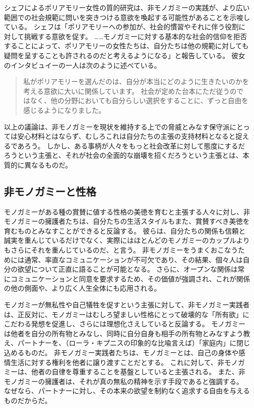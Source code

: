 \documentclass[paper=a4,book,openany]{jlreq}
\begin{document}
シェフによるポリアモリー女性の質的研究は、非モノガミーの実践が、より広い範囲での社会規範に問いを突きつける意欲を喚起する可能性があることを示唆している。
シェフは「ポリアモリーへの参加が、社会的慣習やそれに伴う役割に対して挑戦する意欲を促す。
……モノガミーに対する基本的な社会的信仰を拒否することによって、ポリアモリーの女性たちは、自分たちは他の規範に対しても疑問を呈することも許されるのだと考えるようになる」と報告している。
彼女のインタビュイーの一人は次のように述べている。

\begin{quote}
  私がポリアモリーを選んだのは、自分が本当にどのように生きたいのかを考える意欲に大いに関係しています。
社会が定めた台本にただ従うのではなく、他の分野においても自分らしい選択をすることに、ずっと自由を感じるようになりました。
\citep[pp.9--10]{sheff05:_polyam_women_sexual_subjec_power}

\end{quote}

以上の議論は、非モノガミーを現状を維持する上での脅威とみなす保守派にとっては安心材料とはならず、むしろこれは自分たちの主張の支持材料となると捉えるであろう。
しかし、ある事柄が人々をもっと社会改革に対して態度にするだろうという主張と、それが社会の全面的な崩壊を招くだろうという主張とは、本質的に異なるものだ。

\subsection{非モノガミーと性格}

モノガミーがある種の賞賛に値する性格の美徳を育むと主張する人々に対し、非モノガミーの擁護者たちは、自分たちの生活スタイルもまた、賞賛すべき美徳を育むものとみなすことができると反論する。
彼らは、自分たちの関係も信頼と誠実を重んじているだけでなく、実際にはほとんどのモノガミーのカップルよりもさらにそれを重んじているのだ、と言う。
非モノガミーをうまくおこなうためには通常、率直なコミュニケーションが不可欠であり、その結果、個々人は自分の欲望について正直に語ることが可能となる。
さらに、オープンな関係は常にコミュニケーションと同意を要求するため、その価値が強調され、これが関係の他の側面や、より広く人生全体にも応用される。

モノガミーが無私性や自己犠牲を促すという主張に対して、非モノガミー実践者は、正反対に、モノガミーはむしろ望ましい性格にとって破壊的な「所有欲」にこだわる発想を促進し、さらには理想化さえしていると反論する。
モノガミーは他者を自分の所有物とみなし、同時に自分自身も相手の所有物とみなすよう教え、パートナーを、（ローラ・キプニスの印象的な比喩言えば）「家庭内」に閉じ込めるものだ。
非モノガミー実践者たちは、モノガミーとは、自己の身体や感情生活に対する権利を他者に譲り渡すことだとする。
これに対して、非モノガミーは、他者の自律を尊重することを基盤としていると主張される。
また、非モノガミーの擁護者は、それが真の無私の精神を示す手段であると強調する。
なぜなら、パートナーに対し、その本来の欲望を制約なく追求する自由を与えるものだからだ。
\end{document}
